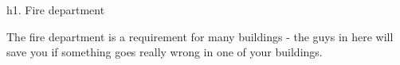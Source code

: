 h1. Fire department

The fire department is a requirement for many buildings - the guys in here will save you if something goes really wrong in one of your buildings.
